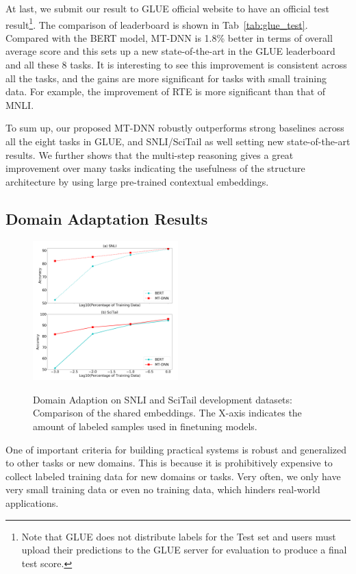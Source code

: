 At last, we submit our result to GLUE official website to have an official test result\footnote{Note that GLUE does not distribute labels for the Test set and users must upload their predictions to the GLUE server for evaluation to produce a final test score.}. The comparison of leaderboard is shown in Tab~\ref{tab:glue_test}. Compared with the BERT model, MT-DNN is 1.8\% better in terms of overall average score and this sets up a new state-of-the-art in the GLUE leaderboard and all these 8 tasks.  It is interesting to see this improvement is consistent across all the tasks,  and the gains are more significant for tasks with small training data. For example, the improvement of RTE is more significant than that of MNLI.  


To sum up, our proposed MT-DNN robustly outperforms
strong baselines across all the eight tasks in GLUE, and SNLI/SciTail as well setting new state-of-the-art results. We further shows that the multi-step reasoning gives a great improvement over many tasks indicating the usefulness of the structure architecture by using large pre-trained contextual embeddings.


\fi

\subsection{Domain Adaptation Results}
\label{sec:domain}
\begin{figure}[t!]
    \centering
 {
	\includegraphics[width=0.5\textwidth]{fig/da.png}
    }   
    \caption{\label{fig:domain} Domain Adaption on SNLI and SciTail development datasets: Comparison of the shared embeddings. The X-axis indicates the amount of labeled samples used in finetuning models.}
\end{figure}
One of important criteria for building practical systems is robust and generalized to other tasks or new domains. This is because it is prohibitively expensive to collect labeled training data for new domains or tasks. Very often, we only have very small training data or even no training data, which hinders real-world applications. 

